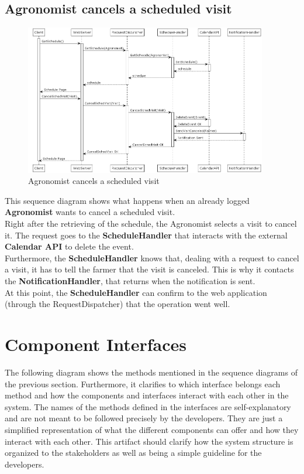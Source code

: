 \documentclass[10pt]{report}
\begin{document}
\subsection{Agronomist cancels a scheduled visit}
\begin{figure}[H]
    \centering
    \includegraphics[width=400px]{SequenceDiagram/Agronomist_2_5.png}
    \caption{Agronomist cancels a scheduled visit}
\end{figure}
This sequence diagram shows what happens when an already logged \textbf{Agronomist} wants to cancel a scheduled visit.\\

Right after the retrieving of the schedule, the Agronomist selects a visit to cancel it.
The request goes to the \textbf{ScheduleHandler} that interacts with the external \textbf{Calendar API} to delete the event. \\ 
Furthermore, the \textbf{ScheduleHandler} knows that, dealing with a request to cancel a visit, it has to tell the farmer that the visit is canceled. This is why it contacts the \textbf{NotificationHandler}, that returns when the notification is sent. \\
At this point, the \textbf{ScheduleHandler} can confirm to the web application (through the RequestDispatcher) that the operation went well.
\section{Component Interfaces}
The following diagram shows the methods mentioned in the sequence diagrams of the previous section. Furthermore, it clarifies to which interface belongs each method and how the components and interfaces interact with each other in the system.
The names of the methods defined in the
interfaces are self-explanatory and are not meant to be followed precisely by the
developers. They are just a simplified representation of what the different
components can offer and how they interact with each other. This artifact should clarify  how the system structure is organized to the stakeholders as well as being a simple guideline for the developers.
\end{document}
